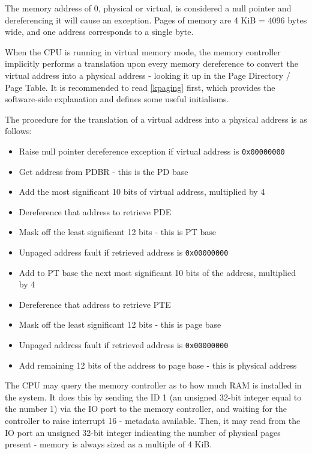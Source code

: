 \documentclass[12pt,a4paper]{report}
\begin{document}
The memory address of 0, physical or virtual, is considered a null pointer and dereferencing it will cause an exception. Pages of memory are 4 KiB = 4096 bytes wide, and one address corresponds to a single byte.

When the CPU is running in virtual memory mode, the memory controller implicitly performs a translation upon every memory dereference to convert the virtual address into a physical address - looking it up in the Page Directory / Page Table. It is recommended to read \autoref{kpaging} first, which provides the software-side explanation and defines some useful initialisms.

The procedure for the translation of a virtual address into a physical address is as follows:
\begin{itemize}
  \renewcommand\labelitemi{--}
  \item Raise null pointer dereference exception if virtual address is \texttt{0x00000000}
  \item Get address from PDBR - this is the PD base
  \item Add the most significant 10 bits of virtual address, multiplied by 4
  \item Dereference that address to retrieve PDE
  \item Mask off the least significant 12 bits - this is PT base
  \item Unpaged address fault if retrieved address is \texttt{0x00000000}
  \item Add to PT base the next most significant 10 bits of the address, multiplied by 4
  \item Dereference that address to retrieve PTE
  \item Mask off the least significant 12 bits - this is page base
  \item Unpaged address fault if retrieved address is \texttt{0x00000000}
  \item Add remaining 12 bits of the address to page base - this is physical address
\end{itemize}

The CPU may query the memory controller as to how much RAM is installed in the system. It does this by sending the ID 1 (an unsigned 32-bit integer equal to the number 1) via the IO port to the memory controller, and waiting for the controller to raise interrupt 16 - metadata available. Then, it may read from the IO port an unsigned 32-bit integer indicating the number of physical pages present - memory is always sized as a multiple of 4 KiB.
\end{document}
